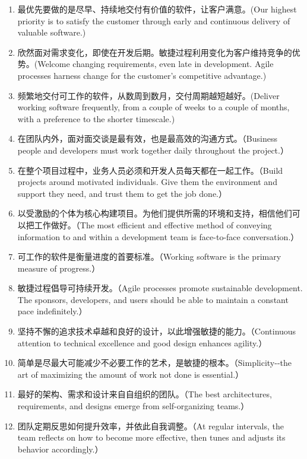 \begin{enumerate}
\tightlist
\item
  最优先要做的是尽早、持续地交付有价值的软件，让客户满意。(Our highest
  priority is to satisfy the customer through early and continuous
  delivery of valuable software.)
\item
  欣然面对需求变化，即使在开发后期。敏捷过程利用变化为客户维持竞争的优势。(Welcome
  changing requirements, even late in development. Agile processes
  harness change for the customer's competitive advantage.)
\item
  频繁地交付可工作的软件，从数周到数月，交付周期越短越好。(Deliver
  working software frequently, from a couple of weeks to a couple of
  months, with a preference to the shorter timescale.)
\item
  在团队内外，面对面交谈是最有效，也是最高效的沟通方式。（Business
  people and developers must work together daily throughout the
  project.）
\item
  在整个项目过程中，业务人员必须和开发人员每天都在一起工作。（Build
  projects around motivated individuals. Give them the environment and
  support they need, and trust them to get the job done.）
\item
  以受激励的个体为核心构建项目。为他们提供所需的环境和支持，相信他们可以把工作做好。（The
  most efficient and effective method of conveying information to and
  within a development team is face-to-face conversation.）
\item
  可工作的软件是衡量进度的首要标准。（Working software is the primary
  measure of progress.）
\item
  敏捷过程倡导可持续开发。（Agile processes promote sustainable
  development. The sponsors, developers, and users should be able to
  maintain a constant pace indefinitely.）
\item
  坚持不懈的追求技术卓越和良好的设计，以此增强敏捷的能力。（Continuous
  attention to technical excellence and good design enhances agility.）
\item
  简单是尽最大可能减少不必要工作的艺术，是敏捷的根本。（Simplicity-\/-the
  art of maximizing the amount of work not done is essential.）
\item
  最好的架构、需求和设计来自自组织的团队。（The best architectures,
  requirements, and designs emerge from self-organizing teams.）
\item
  团队定期反思如何提升效率，并依此自我调整。（At regular intervals, the
  team reflects on how to become more effective, then tunes and adjusts
  its behavior accordingly.）
\end{enumerate}


